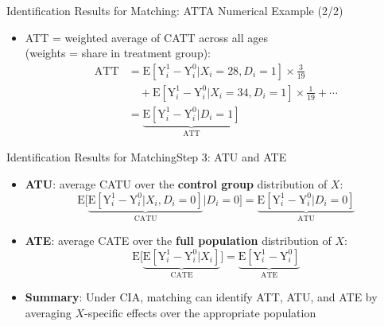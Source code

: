\documentclass[dvipsnames,hyperref={pdfpagelabels=false}]{beamer}
\begin{document}
\begin{frame}{Identification Results for Matching: ATT}{A Numerical Example (2/2)}
	\begin{itemize}
		\item ATT = weighted average of CATT across all ages \\
		(weights = share in treatment group):
		\vspace{0.2cm}
		\begin{equation*}
			\begin{aligned}
				\mathrm{ATT} 
				&= \mathrm{E}[\mathrm{Y}^{1}_{i}-\mathrm{Y}^{0}_{i}|X_{i}=28, D_{i}=1] \times \frac{3}{19} \\  
				&\quad + \mathrm{E}[\mathrm{Y}^{1}_{i}-\mathrm{Y}^{0}_{i}|X_{i}=34, D_{i}=1] \times \frac{1}{19} + \cdots \\[6pt]
				&= \underbrace{\mathrm{E}[\mathrm{Y}^{1}_{i}-\mathrm{Y}^{0}_{i}|D_{i}=1]}_{\text{ATT}}
			\end{aligned}
		\end{equation*}	
	\end{itemize}
\end{frame}



\begin{frame}{Identification Results for Matching}{Step 3: ATU and ATE}
	\begin{itemize}
		
		\item \textbf{ATU}: average CATU over the \textbf{control group} distribution of $X$:
		\begin{equation*}
			\mathrm{E}\Big[\underbrace{\mathrm{E}[\mathrm{Y}^{1}_{i}-\mathrm{Y}^{0}_{i}|X_{i},D_i=0]}_{\text{CATU}}\Big| D_i=0\Big] 
			=\underbrace{\mathrm{E}[\mathrm{Y}^{1}_{i}-\mathrm{Y}^{0}_{i}|D_i=0]}_{\text{ATU}}
		\end{equation*}
		
		\vspace{0.2cm}
		\item \textbf{ATE}: average CATE over the \textbf{full population} distribution of $X$:
		\begin{equation*}
			\mathrm{E}\Big[\underbrace{\mathrm{E}[\mathrm{Y}^{1}_{i}-\mathrm{Y}^{0}_{i}|X_{i}]}_{\text{CATE}}\Big] 
			=\underbrace{\mathrm{E}[\mathrm{Y}^{1}_{i}-\mathrm{Y}^{0}_{i}]}_{\text{ATE}}
		\end{equation*}
		
		\vspace{0.2cm}
		\item \textbf{Summary}: Under CIA, matching can identify ATT, ATU, and ATE by averaging $X$-specific effects over the appropriate population
		
	\end{itemize}
\end{frame}
\end{document}
